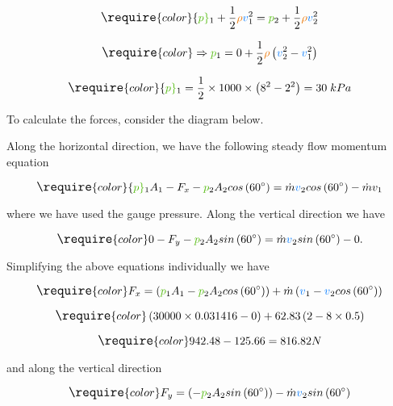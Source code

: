 \documentclass[
  1.2em,
  letterpaper,
  DIV=11,
  numbers=noendperiod]{scrartcl}
\begin{document}
\[
\large
\require{color}
{\color[rgb]{0.315209,0.728565,0.037706}p}_1 + \frac{1}{2}{\color[rgb]{0.918231,0.469102,0.038229}\rho} {\color[rgb]{0.059472,0.501943,0.998465}v}_1^2 = {\color[rgb]{0.315209,0.728565,0.037706}p}_2 + \frac{1}{2}{\color[rgb]{0.918231,0.469102,0.038229}\rho} {\color[rgb]{0.059472,0.501943,0.998465}v}_2^2
\]

\[
\large
\require{color}
\Rightarrow {\color[rgb]{0.315209,0.728565,0.037706}p}_1 = 0 + \frac{1}{2} {\color[rgb]{0.918231,0.469102,0.038229}\rho} \left( {\color[rgb]{0.059472,0.501943,0.998465}v}_2^2 - {\color[rgb]{0.059472,0.501943,0.998465}v}_1^2\right) 
\]

\[
\large
\require{color}
{\color[rgb]{0.315209,0.728565,0.037706}p}_1 = \frac{1}{2} \times 1000 \times \left(8^2 - 2^2\right) = 30 \; kPa 
\]

To calculate the forces, consider the diagram below.

Along the horizontal direction, we have the following steady flow
momentum equation

\[
\large
\require{color}
{\color[rgb]{0.315209,0.728565,0.037706}p}_1 A_1 - F_{x} - {\color[rgb]{0.315209,0.728565,0.037706}p}_2 A_2 cos\left(60^{\circ} \right) = \dot{m} {\color[rgb]{0.059472,0.501943,0.998465}v}_2 cos\left(60^{\circ}\right) - \dot{m} v_1 
\]

where we have used the gauge pressure. Along the vertical direction we
have

\[
\large
\require{color}
0 - F_y - {\color[rgb]{0.315209,0.728565,0.037706}p}_2 A_2 sin\left(60^{\circ}\right) = \dot{m}{\color[rgb]{0.059472,0.501943,0.998465}v}_2 sin\left( 60^{\circ}\right) - 0.
\]

Simplifying the above equations individually we have

\[
\large
\require{color}
F_{x}  = \left( {\color[rgb]{0.315209,0.728565,0.037706}p}_1 A_1 - {\color[rgb]{0.315209,0.728565,0.037706}p}_2 A_2 cos\left( 60^{\circ} \right) \right) + \dot{m}\left( {\color[rgb]{0.059472,0.501943,0.998465}v}_1 - {\color[rgb]{0.059472,0.501943,0.998465}v}_2 cos\left(60^{\circ} \right) \right)
\]

\[
\large
\require{color}
\left( 30000 \times 0.031416  - 0 \right) + 62.83 \left(2 - 8 \times 0.5 \right) 
\]

\[
\large
\require{color}
942.48 - 125.66 =  816.82 N
\]

and along the vertical direction

\[
\large
\require{color}
F_y = \left(-{\color[rgb]{0.315209,0.728565,0.037706}p}_2 A_2 sin\left( 60^{\circ}\right) \right) - \dot{m}{\color[rgb]{0.059472,0.501943,0.998465}v}_2 sin\left( 60^{\circ} \right) 
\]
\end{document}
